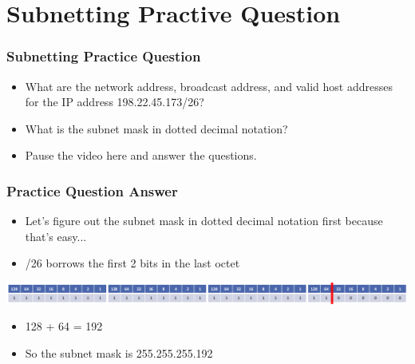 \documentclass[pdflatex,compress]{beamer}
\begin{document}
\section{Subnetting Practive Question}

\begin{frame}
	\frametitle{Subnetting Practice Question}
	\begin{itemize}
		\item What are the network address, broadcast address, and valid host addresses for the IP address 198.22.45.173/26?
		\item What is the subnet mask in dotted decimal notation?
		\item Pause the video here and answer the questions.
	\end{itemize}	
\end{frame}

\begin{frame}
	\frametitle{Practice Question Answer}
	\begin{itemize}
		\item Let's figure out the subnet mask in dotted decimal notation first because that's easy...
		\item /26 borrows the first 2 bits in the last octet
	\end{itemize}	
	\begin{center}
		\includegraphics[width=1\linewidth]{img/img06}
	\end{center}
	\begin{itemize}
		\item 128 + 64 = 192
		\item So the subnet mask is 255.255.255.192
	\end{itemize}
\end{frame}
\end{document}
